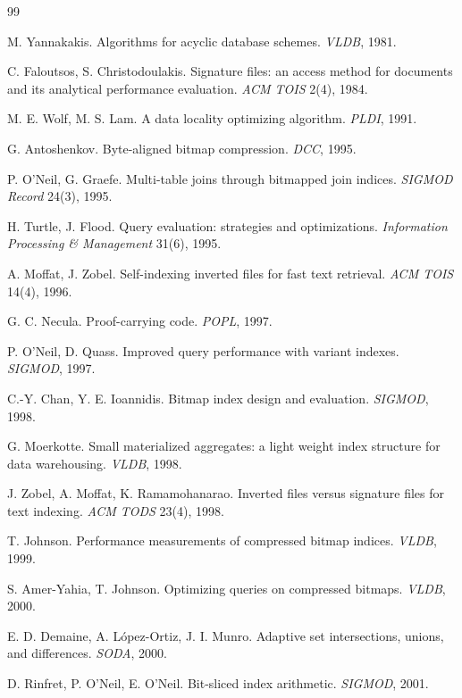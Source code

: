 \documentclass[sigconf,nonacm]{acmart}
\begin{document}
\begin{thebibliography}{99}
\small

 M. Yannakakis. Algorithms for acyclic database
schemes. \emph{VLDB}, 1981.

 C. Faloutsos, S. Christodoulakis. Signature
files: an access method for documents and its analytical performance
evaluation. \emph{ACM TOIS} 2(4), 1984.

 M. E. Wolf, M. S. Lam. A data locality optimizing
algorithm. \emph{PLDI}, 1991.

 G. Antoshenkov. Byte-aligned bitmap
compression. \emph{DCC}, 1995.

 P. O'Neil, G. Graefe. Multi-table joins through
bitmapped join indices. \emph{SIGMOD Record} 24(3), 1995.

 H. Turtle, J. Flood. Query evaluation: strategies
and optimizations. \emph{Information Processing \& Management} 31(6),
1995.

 A. Moffat, J. Zobel. Self-indexing inverted files
for fast text retrieval. \emph{ACM TOIS} 14(4), 1996.

 G. C. Necula. Proof-carrying code. \emph{POPL},
1997.

 P. O'Neil, D. Quass. Improved query performance with
variant indexes. \emph{SIGMOD}, 1997.

 C.-Y. Chan, Y. E. Ioannidis. Bitmap index design and
evaluation. \emph{SIGMOD}, 1998.

 G. Moerkotte. Small materialized aggregates: a
light weight index structure for data warehousing. \emph{VLDB}, 1998.

 J. Zobel, A. Moffat, K. Ramamohanarao. Inverted
files versus signature files for text indexing. \emph{ACM TODS} 23(4),
1998.

 T. Johnson. Performance measurements of
compressed bitmap indices. \emph{VLDB}, 1999.

 S. Amer-Yahia, T. Johnson. Optimizing queries on
compressed bitmaps. \emph{VLDB}, 2000.

 E. D. Demaine, A. L\'opez-Ortiz, J. I. Munro.
Adaptive set intersections, unions, and differences. \emph{SODA}, 2000.

 D. Rinfret, P. O'Neil, E. O'Neil. Bit-sliced index
arithmetic. \emph{SIGMOD}, 2001.


\end{thebibliography}
\end{document}
